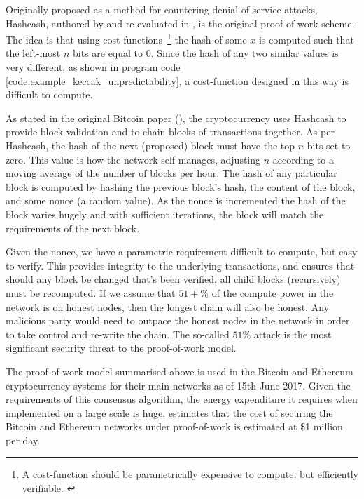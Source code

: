 Originally proposed as a method for countering denial of service attacks, Hashcash, authored by \cite{hashcash:1997:misc} and re-evaluated in \cite{hashcash:2002:misc}, is the original proof of work scheme. The idea is that using cost-functions~\footnote{A cost-function should be parametrically expensive to compute, but efficiently verifiable. \cite{hashcash:2002:misc}} the hash of some $x$ is computed such that the left-most $n$ bits are equal to $0$. Since the hash of any two similar values is very different, as shown in program code \ref{code:example_keccak_unpredictability}, a cost-function designed in this way is difficult to compute.



As stated in the original Bitcoin paper (\cite{bitcoin:2008:misc}), the cryptocurrency uses Hashcash to provide block validation and to chain blocks of transactions together. As per Hashcash, the hash of the next (proposed) block must have the top $n$ bits set to zero. This value is how the network self-manages, adjusting $n$ according to a moving average of the number of blocks per hour. The hash of any particular block is computed by hashing the previous block's hash, the content of the block, and some nonce (a random value). As the nonce is incremented the hash of the block varies hugely and with sufficient iterations, the block will match the requirements of the next block.

Given the nonce, we have a parametric requirement difficult to compute, but easy to verify. This provides integrity to the underlying transactions, and ensures that should any block be changed that's been verified, all child blocks (recursively) must be recomputed. If we assume that $51+\%$ of the compute power in the network is on honest nodes, then the longest chain will also be honest. Any malicious party would need to outpace the honest nodes in the network in order to take control and re-write the chain. The so-called $51\%$ attack is the most significant security threat to the proof-of-work model.

The proof-of-work model summarised above is used in the Bitcoin and Ethereum cryptocurrency systems for their main networks as of 15th June 2017. Given the requirements of this consensus algorithm, the energy expenditure it requires when implemented on a large scale is huge. \cite{ethereumwiki:2017:online} estimates that the cost of securing the Bitcoin and Ethereum networks under proof-of-work is estimated at \$1 million per day.

